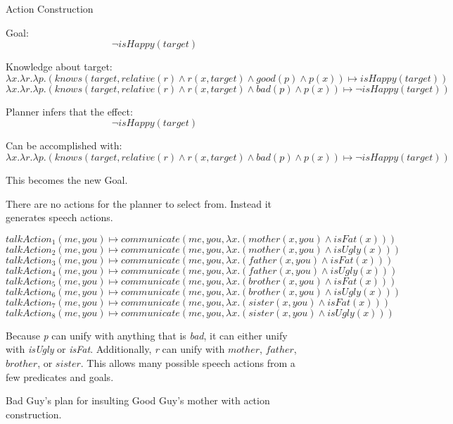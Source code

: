\documentclass{article}
\begin{document}


  
\begin{figure}[htpb!]
\begin{center}\large{Action Construction}\end{center}

  Goal:
  $$
  \neg isHappy(target)
  $$

  Knowledge about target:
  \[
  \lambda x.\lambda r.\lambda p.(knows(target, relative(r) \wedge r(x,target) \wedge good(p) \wedge p(x)) \mapsto isHappy(target))
  \]
  \[
  \lambda x.\lambda r.\lambda p.(knows(target, relative(r) \wedge r(x,target) \wedge bad(p) \wedge p(x)) \mapsto \neg isHappy(target))
  \]
  
  Planner infers that the effect:
  \[
  \neg isHappy(target)
  \]

  Can be accomplished with:
  \[
  \lambda x.\lambda r.\lambda p.(knows(target, relative(r) \wedge r(x,target) \wedge bad(p) \wedge p(x)) \mapsto \neg isHappy(target))
  \]

  This becomes the new Goal.

  There are no actions for the planner to select from.  Instead it generates speech
  actions.

  \[
  talkAction_1(me, you) \mapsto communicate(me, you, \lambda x.(mother(x, you) \wedge isFat(x)))
  \]
  \[
  talkAction_2(me, you) \mapsto communicate(me, you, \lambda x.(mother(x, you) \wedge isUgly(x)))
  \]
  \[
  talkAction_3(me, you) \mapsto communicate(me, you, \lambda x.(father(x, you) \wedge isFat(x)))
  \]
  \[
  talkAction_4(me, you) \mapsto communicate(me, you, \lambda x.(father(x, you) \wedge isUgly(x)))
  \]
  \[
  talkAction_5(me, you) \mapsto communicate(me, you, \lambda x.(brother(x, you) \wedge isFat(x)))
  \]
  \[
  talkAction_6(me, you) \mapsto communicate(me, you, \lambda x.(brother(x, you) \wedge isUgly(x)))
  \]
  \[
  talkAction_7(me, you) \mapsto communicate(me, you, \lambda x.(sister(x, you) \wedge isFat(x)))
  \]
  \[
  talkAction_8(me, you) \mapsto communicate(me, you, \lambda x.(sister(x, you) \wedge isUgly(x)))
  \]

  Because \emph{p} can unify with anything that is \emph{bad}, it can either unify with
  \emph{isUgly} or \emph{isFat}.  Additionally, \emph{r} can unify with $mother$, $father$, $brother$, or $sister$.  This allows many possible speech actions from a few predicates
  and goals.

  \caption{Bad Guy's plan for insulting Good Guy's mother with action construction.}
  \label{plan_construction}
\end{figure}
\end{document}
